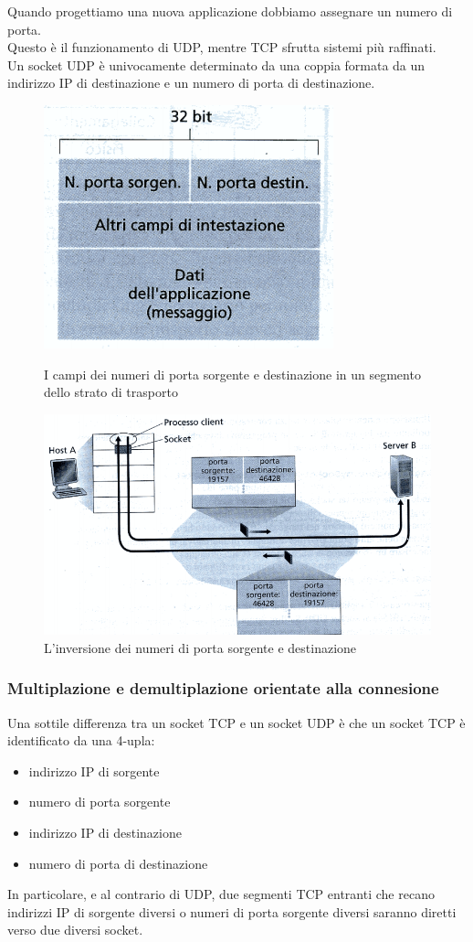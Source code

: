 \documentclass[11pt,a4paper]{article}
\begin{document}
Quando progettiamo una nuova applicazione dobbiamo assegnare un numero di porta. \\
Questo è il funzionamento di UDP, mentre TCP sfrutta sistemi più raffinati. \\
Un socket UDP è univocamente determinato da una coppia formata da un indirizzo IP di destinazione e un numero di porta di destinazione.


\begin{figure}
	\includegraphics[scale=0.6]{img/011.png}
	\caption{I campi dei numeri di porta sorgente e destinazione in un segmento dello strato di trasporto} 
	\includegraphics[scale=0.6]{img/012.png}
	\caption{L'inversione dei numeri di porta sorgente e destinazione}
\end{figure}


\subsubsection{Multiplazione e demultiplazione orientate alla connesione}
Una sottile differenza tra un socket TCP e un socket UDP è che un socket TCP è identificato da una 4-upla:
\begin{itemize}
	\item indirizzo IP di sorgente
	\item numero di porta sorgente
	\item indirizzo IP di destinazione
	\item numero di porta di destinazione
\end{itemize}
In particolare, e al contrario di UDP, due segmenti TCP entranti che recano indirizzi IP di sorgente diversi o numeri di porta sorgente diversi saranno diretti verso due diversi socket. \\
\end{document}
